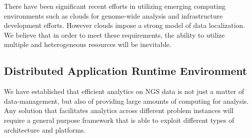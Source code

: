\documentclass{cpeauth}
\begin{document}
There have been significant recent efforts in utilizing emerging
computing environments such as clouds for genome-wide analysis and
infrastructure development efforts\cite{taylor2010,cloudburst,
  cloudblast, langmead2009, langmead2010,gatk,
  halligan2009,luyf-2010}. However clouds impose a strong model of
data localization.  We believe that in order to meet these
requirements, the ability to utilize multiple and heterogeneous
resources will be inevitable.



% 


\subsection{Distributed Application Runtime Environment}

We have established that efficient analytics on NGS data is not just a
matter of data-management, but also of providing large amounts of
computing for analysis. Any solution that facilitates analytics across
different problem instances will require a general purpose framework
that is able to exploit different types of architecture and platforms.
 
\end{document}
